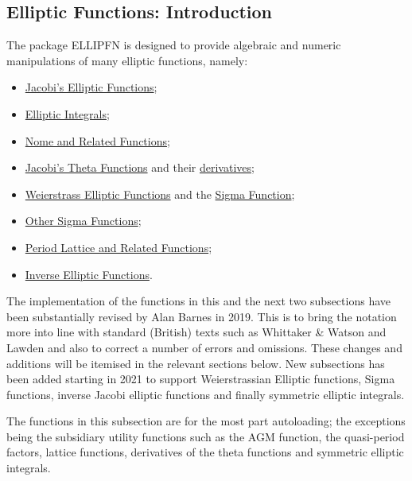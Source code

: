 
\subsection{Elliptic Functions: Introduction}
\hypertarget{ELLIPFNS}{}
\ifdefined{}\fi
%
The package ELLIPFN is designed to provide algebraic and numeric manipulations of
many elliptic functions, namely:

\begin{itemize}
\item \hyperlink{JACEF}{Jacobi's Elliptic Functions};
\item \hyperlink{ELLIPI}{Elliptic Integrals};
\item \hyperlink{ELLIPNOME}{Nome and Related Functions};
\item \hyperlink{JACTF}{Jacobi's Theta Functions} and their
\hyperlink{THETAD}{ derivatives};
\item \hyperlink{WEIERSTRASS}{Weierstrass Elliptic Functions} and the
\hyperlink{SIGMA}{Sigma Function};
\item \hyperlink{SIGMA1}{Other Sigma Functions};
\item \hyperlink{ETA}{Period Lattice and Related Functions};
\item \hyperlink{INVELL}{Inverse Elliptic Functions}.
\end{itemize}

The implementation of the functions in this and the next two subsections have
been substantially revised by Alan Barnes in 2019. This is to bring the
notation more into line with standard (British) texts such as Whittaker
\& Watson \cite{WhittakerWatson:69} and Lawden \cite{Lawden:89} and also to correct
a number of errors and omissions. These changes and additions will be itemised in the relevant
sections below.  New subsections has been added starting in 2021 to support  Weierstrassian Elliptic
functions, Sigma functions, inverse Jacobi elliptic functions and finally symmetric elliptic integrals.

The functions in this subsection are for the most part autoloading;
the exceptions being the subsidiary utility functions such as the AGM function,
the quasi-period factors, lattice functions, derivatives of the theta functions and symmetric elliptic integrals.

